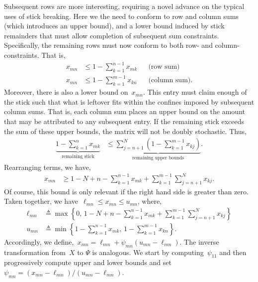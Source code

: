 \documentclass[twoside]{article}
\begin{document}
Subsequent rows are more interesting, requiring a novel advance on the
typical uses of stick breaking. Here we the need to conform to row and
column sums (which introduces an upper bound), and a lower bound
induced by stick remainders that must allow completion of subsequent
sum constraints.  Specifically, the remaining rows must now conform to
both row- and column-constraints. That is,
\begin{align*}
x_{mn} &\leq 1- \sum_{k=1}^{n-1} x_{mk} & & \text{(row sum)} \\
x_{mn} &\leq 1- \sum_{k=1}^{m-1} x_{kn} & & \text{(column sum)}.
\end{align*}
Moreover, there is also a lower bound on~$x_{mn}$. This entry must
claim enough of the stick such that what is leftover fits within
the confines imposed by subsequent column sums. That is, each column
sum places an upper bound on the amount that may be attributed to any
subsequent entry. If the remaining stick exceeds the sum of these
upper bounds, the matrix will not be doubly stochastic.  Thus,
\begin{align*}
\underbrace{1 - \sum_{k=1}^n x_{mk}}_{\text{remaining stick}}
  &\leq \underbrace{\sum_{j=n+1}^N (1- \sum_{k=1}^{m-1} x_{kj})}_{
    \text{remaining upper bounds}}.
\end{align*}
Rearranging terms, we have,
\begin{align*}
  x_{mn} &\geq
1 - N + n - \sum_{k=1}^{n-1} x_{mk}  +  \sum_{k=1}^{m-1} \sum_{j=n+1}^N x_{kj}.
\end{align*}
Of course, this bound is only relevant if the right hand side is greater than zero.
Taken together, we have~$\ell_{mn} \leq x_{mn} \leq u_{mn}$, where,
\begin{align*}
\ell_{mn} &\triangleq \max \left \{0, \, 1 - N + n - \sum_{k=1}^{n-1} x_{mk}  +  \sum_{k=1}^{m-1} \sum_{j=n+1}^N x_{kj} \right \}
\\
u_{mn} &\triangleq 
\min \left \{1- \sum_{k=1}^{n-1} x_{mk}, \,
1- \sum_{k=1}^{m-1} x_{kn} \right\}.
\end{align*}
Accordingly, we define,~${x_{mn} = \ell_{mn} + \psi_{mn} (u_{mn} - \ell_{mn})}$.
The inverse transformation from~$X$ to $\Psi$ is analogous.
We start by computing~$\psi_{11}$ and then progressively compute
upper and lower bounds and set~${\psi_{mn} = (x_{mn} - \ell_{mn})/(u_{mn} - \ell_{mn})}$.
\end{document}
